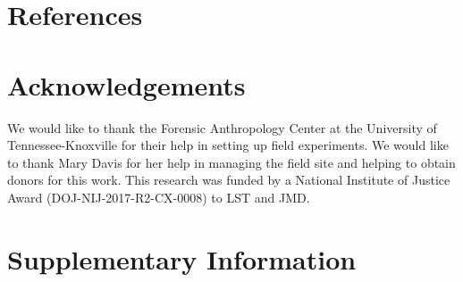 \documentclass[
  sn-nature,
  lineno, referee]{sn-jnl}
\begin{document}
\section{References}\label{references}

\renewcommand{\bibsection}{}


\section{Acknowledgements}\label{acknowledgements}

We would like to thank the Forensic Anthropology Center at the
University of Tennessee-Knoxville for their help in setting up field
experiments. We would like to thank Mary Davis for her help in managing
the field site and helping to obtain donors for this work. This research
was funded by a National Institute of Justice Award
(DOJ-NIJ-2017-R2-CX-0008) to LST and JMD.

\section*{Supplementary Information}\label{supplementary-information}
\end{document}
